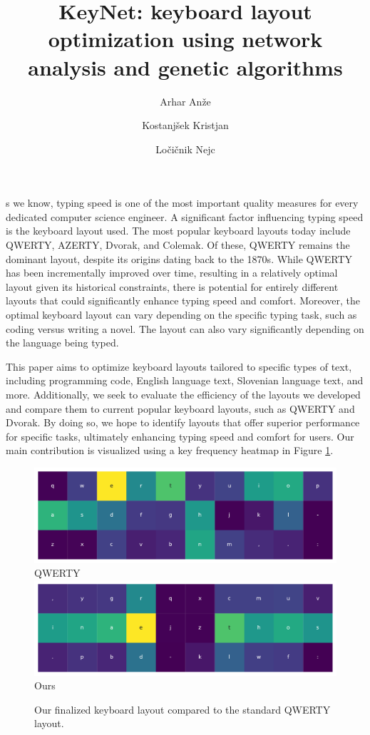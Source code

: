 \documentclass[9pt,twocolumn,twoside]{pnas-report}
\title{KeyNet: keyboard layout optimization using network analysis and genetic algorithms}
\author[a,1]{Arhar Anže}
\author[a]{Kostanjšek Kristjan}
\author[a]{Ločičnik Nejc}
\affil[a]{University of Ljubljana, Faculty of Computer and Information Science, Ve\v{c}na pot 113, SI-1000 Ljubljana, Slovenia}
\begin{document}
\maketitle
\thispagestyle{firststyle}

s we know, typing speed is one of the most important quality measures for every dedicated computer science engineer.
A significant factor influencing typing speed is the keyboard layout used.
The most popular keyboard layouts today include QWERTY, AZERTY, Dvorak, and Colemak.
Of these, QWERTY remains the dominant layout, despite its origins dating back to the 1870s.
While QWERTY has been incrementally improved over time, resulting in a relatively optimal layout given its historical constraints, there is potential for entirely different layouts that could significantly enhance typing speed and comfort.
Moreover, the optimal keyboard layout can vary depending on the specific typing task, such as coding versus writing a novel.
The layout can also vary significantly depending on the language being typed.

This paper aims to optimize keyboard layouts tailored to specific types of text, including programming code, English language text, Slovenian language text, and more.
Additionally, we seek to evaluate the efficiency of the layouts we developed and compare them to current popular keyboard layouts, such as QWERTY and Dvorak.
By doing so, we hope to identify layouts that offer superior performance for specific tasks, ultimately enhancing typing speed and comfort for users.
Our main contribution is visualized using a key frequency heatmap in Figure \ref{fig:main_contributions}.

\begin{figure}[t]\centering%
    \includegraphics[width=0.9\linewidth]{fig/qwerty}
    \small{QWERTY}
    \vskip8pt
    \includegraphics[width=0.9\linewidth]{fig/genetic}\\
    \small{Ours}
    \caption{Our finalized keyboard layout compared to the standard QWERTY layout.}
    \label{fig:main_contributions}
\end{figure}
\end{document}
